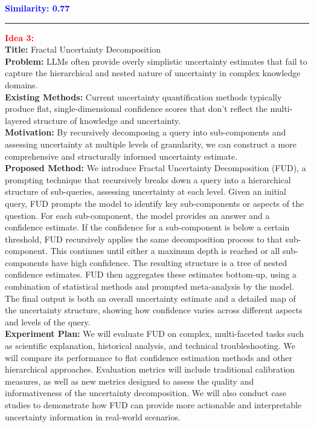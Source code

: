 \vspace{0.5em}

\noindent\textbf{\textcolor{blue}{Similarity: 0.77}} \\

\hrule

\vspace{1em}

\textbf{\textcolor{red}{Idea 3:}} \\
\textbf{Title:} Fractal Uncertainty Decomposition \\
\textbf{Problem:} LLMs often provide overly simplistic uncertainty estimates that fail to capture the hierarchical and nested nature of uncertainty in complex knowledge domains. \\
\textbf{Existing Methods:} Current uncertainty quantification methods typically produce flat, single-dimensional confidence scores that don't reflect the multi-layered structure of knowledge and uncertainty. \\
\textbf{Motivation:} By recursively decomposing a query into sub-components and assessing uncertainty at multiple levels of granularity, we can construct a more comprehensive and structurally informed uncertainty estimate. \\
\textbf{Proposed Method:} We introduce Fractal Uncertainty Decomposition (FUD), a prompting technique that recursively breaks down a query into a hierarchical structure of sub-queries, assessing uncertainty at each level. Given an initial query, FUD prompts the model to identify key sub-components or aspects of the question. For each sub-component, the model provides an answer and a confidence estimate. If the confidence for a sub-component is below a certain threshold, FUD recursively applies the same decomposition process to that sub-component. This continues until either a maximum depth is reached or all sub-components have high confidence. The resulting structure is a tree of nested confidence estimates. FUD then aggregates these estimates bottom-up, using a combination of statistical methods and prompted meta-analysis by the model. The final output is both an overall uncertainty estimate and a detailed map of the uncertainty structure, showing how confidence varies across different aspects and levels of the query. \\
\textbf{Experiment Plan:} We will evaluate FUD on complex, multi-faceted tasks such as scientific explanation, historical analysis, and technical troubleshooting. We will compare its performance to flat confidence estimation methods and other hierarchical approaches. Evaluation metrics will include traditional calibration measures, as well as new metrics designed to assess the quality and informativeness of the uncertainty decomposition. We will also conduct case studies to demonstrate how FUD can provide more actionable and interpretable uncertainty information in real-world scenarios.

